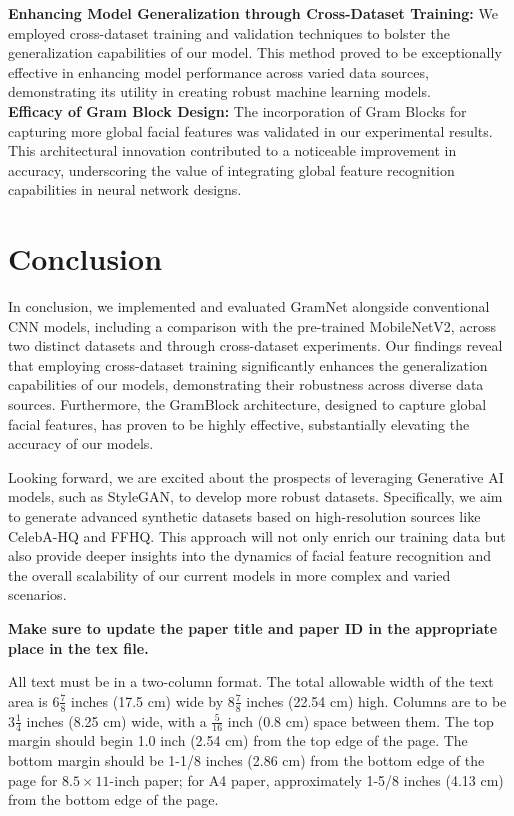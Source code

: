 \documentclass[rebuttal]{cvpr}
\begin{document}
\textbf{ Enhancing Model Generalization through Cross-Dataset Training:} We employed cross-dataset training and validation techniques to bolster the generalization capabilities of our model. This method proved to be exceptionally effective in enhancing model performance across varied data sources, demonstrating its utility in creating robust machine learning models.\\

\textbf{ Efficacy of Gram Block Design:} The incorporation of Gram Blocks for capturing more global facial features was validated in our experimental results. This architectural innovation contributed to a noticeable improvement in accuracy, underscoring the value of integrating global feature recognition capabilities in neural network designs.

\section{Conclusion}
In conclusion, we implemented and evaluated GramNet alongside conventional CNN models, including a comparison with the pre-trained MobileNetV2, across two distinct datasets and through cross-dataset experiments. Our findings reveal that employing cross-dataset training significantly enhances the generalization capabilities of our models, demonstrating their robustness across diverse data sources. Furthermore, the GramBlock architecture, designed to capture global facial features, has proven to be highly effective, substantially elevating the accuracy of our models.

Looking forward, we are excited about the prospects of leveraging Generative AI models, such as StyleGAN, to develop more robust datasets. Specifically, we aim to generate advanced synthetic datasets based on high-resolution sources like CelebA-HQ and FFHQ. This approach will not only enrich our training data but also provide deeper insights into the dynamics of facial feature recognition and the overall scalability of our current models in more complex and varied scenarios.


{\bf Make sure to update the paper title and paper ID in the appropriate place in the tex file.}

All text must be in a two-column format. The total allowable width of the text
area is $6\frac78$ inches (17.5 cm) wide by $8\frac78$ inches (22.54 cm) high.
Columns are to be $3\frac14$ inches (8.25 cm) wide, with a $\frac{5}{16}$ inch
(0.8 cm) space between them. The top margin should begin
1.0 inch (2.54 cm) from the top edge of the page.  The bottom margin should be
1-1/8 inches (2.86 cm) from the bottom edge of the page for $8.5 \times
11$-inch paper; for A4 paper, approximately 1-5/8 inches (4.13 cm) from the
bottom edge of the page.
\end{document}
